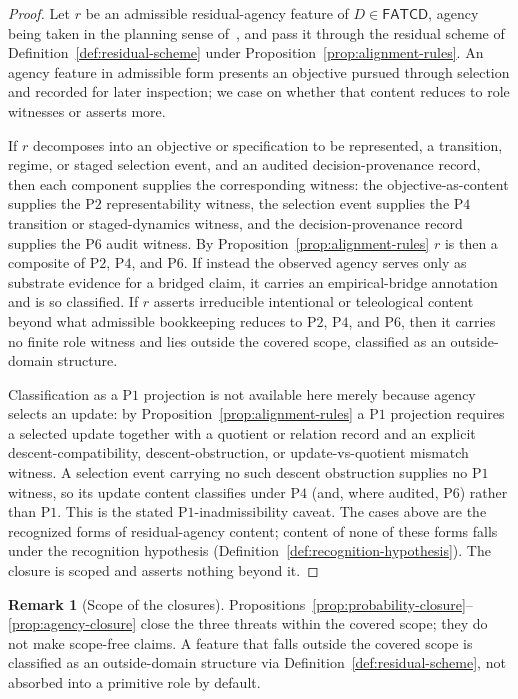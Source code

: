 \documentclass[11pt]{article}
\theoremstyle{definition}
\newtheorem{remark}[theorem]{Remark}
\newcommand{\FATCD}{\ensuremath{\mathsf{FATCD}}}
\newcommand{\Pone}{\ensuremath{\mathrm{P1}}}
\newcommand{\Ptwo}{\ensuremath{\mathrm{P2}}}
\newcommand{\Pfour}{\ensuremath{\mathrm{P4}}}
\newcommand{\Psix}{\ensuremath{\mathrm{P6}}}
\begin{document}
\begin{proof}
Let \(r\) be an admissible residual-agency feature of
\(D \in \FATCD{}\), agency being taken in the planning sense
of~\citet{Bratman1987}, and pass it through the residual scheme of
Definition~\ref{def:residual-scheme} under
Proposition~\ref{prop:alignment-rules}. An agency feature in admissible
form presents an objective pursued through selection and recorded for
later inspection; we case on whether that content reduces to role
witnesses or asserts more.

If \(r\) decomposes into an objective or specification to be
represented, a transition, regime, or staged selection event, and an
audited decision-provenance record, then each component supplies the
corresponding witness: the objective-as-content supplies the \Ptwo{}
representability witness, the selection event supplies the \Pfour{}
transition or staged-dynamics witness, and the decision-provenance
record supplies the \Psix{} audit witness. By
Proposition~\ref{prop:alignment-rules} \(r\) is then a composite of
\Ptwo{}, \Pfour{}, and \Psix{}. If instead the observed agency serves
only as substrate evidence for a bridged claim, it carries an
empirical-bridge annotation and is so classified. If \(r\) asserts
irreducible intentional or teleological content beyond what admissible
bookkeeping reduces to \Ptwo{}, \Pfour{}, and \Psix{}, then it carries
no finite role witness and lies outside the covered scope, classified as
an outside-domain structure.

Classification as a \Pone{} projection is not available here merely
because agency selects an update: by
Proposition~\ref{prop:alignment-rules} a \Pone{} projection requires a
selected update together with a quotient or relation record and an
explicit descent-compatibility, descent-obstruction, or
update-vs-quotient mismatch witness. A selection event carrying no such
descent obstruction supplies no \Pone{} witness, so its update content
classifies under \Pfour{} (and, where audited, \Psix{}) rather than
\Pone{}. This is the stated \Pone{}-inadmissibility caveat. The cases
above are the recognized forms of residual-agency content; content of none of
these forms falls under the recognition hypothesis
(Definition~\ref{def:recognition-hypothesis}). The closure is scoped and asserts
nothing beyond it.
\end{proof}

\begin{remark}[Scope of the closures]\label{rem:threat-closures-scope}
Propositions~\ref{prop:probability-closure}--\ref{prop:agency-closure}
close the three threats within the covered scope; they do not make
scope-free claims. A feature that falls outside the covered scope is
classified as an outside-domain structure via
Definition~\ref{def:residual-scheme}, not absorbed into a primitive role
by default.
\end{remark}
\end{document}
